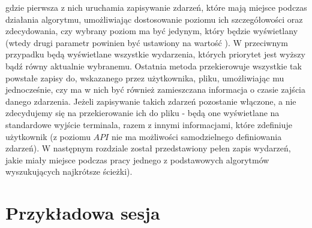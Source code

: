 gdzie pierwsza z nich uruchamia zapisywanie zdarzeń, które mają miejsce podczas działania algorytmu, umożliwiając dostosowanie poziomu ich szczegółowości oraz zdecydowania, czy wybrany poziom ma być jedynym, który będzie wyświetlany (wtedy drugi parametr powinien być ustawiony na wartość \KwTrue). W przeciwnym przypadku będą wyświetlane wszystkie wydarzenia, których priorytet jest wyższy bądź równy aktualnie wybranemu. Ostatnia metoda przekierowuje wszystkie tak powstałe zapisy do, wskazanego przez użytkownika, pliku, umożliwiając mu jednocześnie, czy ma w nich być również zamieszczana informacja o czasie zajścia danego zdarzenia. Jeżeli zapisywanie takich zdarzeń pozostanie włączone, a nie zdecydujemy się na przekierowanie ich do pliku - będą one wyświetlane na standardowe wyjście terminala, razem z innymi informacjami, które zdefiniuje użytkownik (z poziomu $API$ nie ma możliwości samodzielnego definiowania zdarzeń). W następnym rozdziale został przedstawiony pełen zapis wydarzeń, jakie miały miejsce podczas pracy jednego z podstawowych algorytmów wyszukujących najkrótsze ścieżki).

\newpage
\section{Przykładowa sesja}

